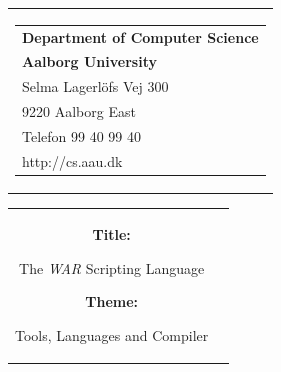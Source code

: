 \documentclass[11pt]{article}
\begin{document}
\thispagestyle{empty}
\begin{titlepage}
\begin{nopagebreak}
{\samepage 
\begin{tabular}{r}
\parbox{\textwidth}{  
\hfill \parbox{4.9cm}{\begin{tabular}{l}
{\sf\small \textbf{Department of Computer Science}}\\
{\sf\small \textbf{Aalborg University}}\\
{\sf\small Selma Lagerlöfs Vej 300} \\
{\sf\small 9220 Aalborg East} \\
{\sf\small Telefon 99 40 99 40} \\
{\sf\small http://cs.aau.dk}
\end{tabular}}}
\\
\end{tabular}

\begin{tabular}{cc}
\parbox{7cm}{
\begin{description}

\item {\bf Title:} 

The \textit{WAR} Scripting Language
  
\item {\bf Theme:} 

Tools, Languages and Compiler

\end{description}

\parbox{8cm}{

}}
\end{tabular}}
\end{nopagebreak}
\end{titlepage}
\end{document}
